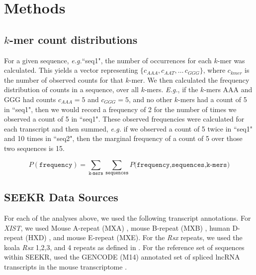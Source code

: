 \clearpage

\section{Methods}

\subsection{$k$-mer count distributions}

For a given sequence, \emph{e.g.}``seq1", the number of occurrences for each $k$-mer was calculated. This yields a vector representing $\{c_{AAA},c_{AAT},\dots\,c_{GGG}\}$, where $c_{kmer}$ is the number of observed counts for that $k$-mer. We then calculated the frequency distribution of counts in a sequence, over all $k$-mers. \emph{E.g.}, if the $k$-mers AAA and GGG had counts $c_{AAA} = 5$ and $c_{GGG} = 5$, and no other $k$-mers had a count of 5 in ``seq1", then we would record a frequency of 2 for the number of times we observed a count of 5 in ``seq1". These observed frequencies were calculated for each transcript and then summed, \emph{e.g.} if we observed a count of 5 twice in ``seq1" and 10 times in ``seq2", then the marginal frequency of a count of 5 over those two sequences is 15.

$$
P(\texttt{frequency}) = \sum_{\texttt{k-mers}}{\sum_{\texttt{sequences}}{P(\texttt{frequency,sequences,k-mers)}}}
$$

\subsection{SEEKR Data Sources}
For each of the analyses above, we used the following transcript annotations. For \emph{XIST}, we used Mouse A-repeat (MXA) \cite{Brockdorff10TheNucleus.}, mouse B-repeat (MXB) \cite{Brockdorff10TheNucleus.}, human D-repeat (HXD) \cite{Brown10TheNucleus.}, and mouse E-repeat (MXE)\cite{Brockdorff10TheNucleus.}. For the \emph{Rsx} repeats, we used the koala \emph{Rsx} 1,2,3, and 4 repeats as defined in \cite{Sprague2019NonlinearDomains}. For the reference set of sequences within SEEKR, used the GENCODE (M14) annotated set of spliced lncRNA transcripts in the mouse transcriptome \cite{Derrien2012TheExpression}. 


\begin{singlespace}
\printbibliography[heading=bibintoc,title={References}]
\end{singlespace}